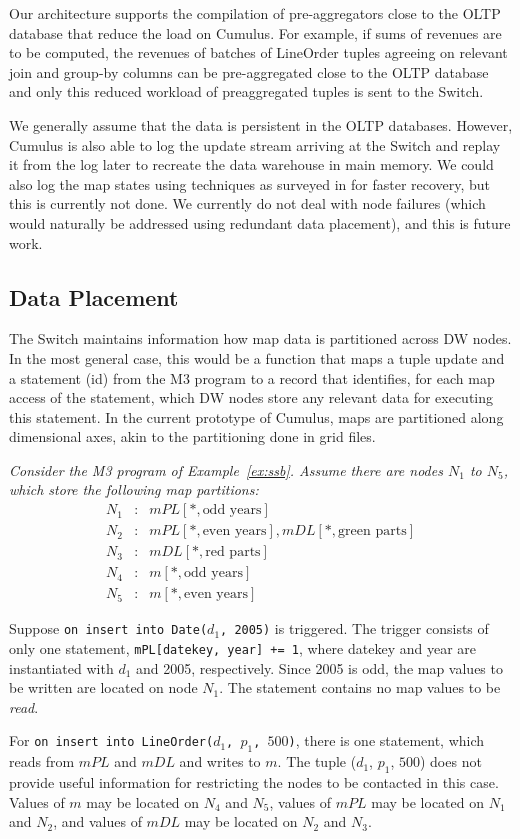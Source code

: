 Our architecture supports the compilation of pre-aggrega\-tors close to the
OLTP database that reduce the load on Cumulus. For example, if sums of revenues
are to be computed, the revenues of batches of LineOrder tuples agreeing
on relevant join and group-by columns can be pre-aggregated close to the OLTP database and only this reduced workload of preaggregated tuples is sent to the Switch.

We generally assume that the data is persistent in the OLTP databases.
However, Cumulus is also able to
log the update stream arriving at the Switch and replay it from the
log later to recreate the data warehouse in main memory.
We could also log the map states using techniques as surveyed in
\cite{DBLP:journals/pvldb/SallesCSDGKW09}
for faster recovery, but this is currently not done.
We currently do not deal with node failures (which would naturally
be addressed using redundant data placement), and this is future work.


\subsection{Data Placement}


The Switch maintains information how map data is partitioned across
DW nodes. In the most general case, this would be a function
that maps a tuple update and a statement (id) from the M3 program to
a record that identifies, for each map access of the statement,
which DW nodes store any relevant data for executing this
statement.
%
In the current prototype of Cumulus, maps are partitioned along
dimensional axes, akin to the partitioning done in grid files\cite{318586}.


\begin{example}\em
\label{ex:switch_msg}
Consider the M3 program of Example~\ref{ex:ssb}.
Assume there are nodes $N_1$ to $N_5$,
which store the following map partitions:
\begin{eqnarray*}
N_1 &:& mPL[*, \mbox{odd years}] \\
N_2 &:& mPL[*, \mbox{even years}], mDL[*, \mbox{green parts}] \\ 
N_3 &:& mDL[*, \mbox{red parts}] \\ 
N_4 &:& m[*, \mbox{odd years}] \\
N_5 &:& m[*, \mbox{even years}]
\end{eqnarray*}

Suppose {\tt on insert into Date($d_1$, 2005)} is triggered.
The trigger consists of only one statement,
{\tt mPL[datekey, year] += 1}, where datekey and year are instantiated
with $d_1$ and 2005, respectively. Since 2005 is odd,
the map values to be written are located on node $N_1$.
The statement contains no map values to be {\em read}.

For {\tt on insert into LineOrder($d_1$, $p_1$, $500$)},
there is one statement, which reads from $mPL$ and $mDL$ and writes to $m$.
The tuple ($d_1$, $p_1$, $500$)
does not provide useful information for restricting the nodes to be contacted
in this case.
Values of $m$ may be located on $N_4$ and $N_5$, values of $mPL$ may be
located on $N_1$ and $N_2$, and values of $mDL$ may be located on $N_2$ and
$N_3$.
\punto
\end{example}


